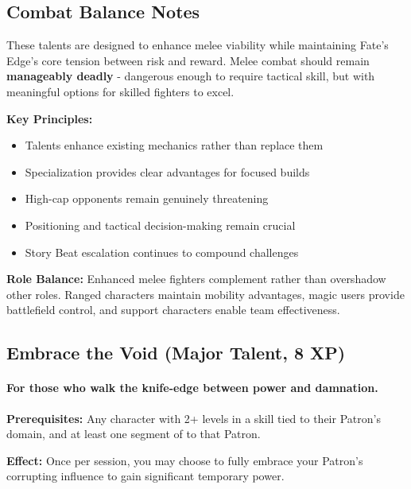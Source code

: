 \subsection{Combat Balance Notes}

These talents are designed to enhance melee viability while maintaining Fate's Edge's core tension between risk and reward. Melee combat should remain \textbf{manageably deadly} - dangerous enough to require tactical skill, but with meaningful options for skilled fighters to excel.

\textbf{Key Principles:}
\begin{itemize}
    \item Talents enhance existing mechanics rather than replace them
    \item Specialization provides clear advantages for focused builds
    \item High-cap opponents remain genuinely threatening
    \item Positioning and tactical decision-making remain crucial
    \item Story Beat escalation continues to compound challenges
\end{itemize}

\textbf{Role Balance:} Enhanced melee fighters complement rather than overshadow other roles. Ranged characters maintain mobility advantages, magic users provide battlefield control, and support characters enable team effectiveness.

\subsection{Embrace the Void (Major Talent, 8 XP)}
\paragraph{For those who walk the knife-edge between power and damnation.}

\textbf{Prerequisites:} Any character with 2+ levels in a skill tied to their Patron's domain, and at least one segment of  to that Patron.

\textbf{Effect:} Once per session, you may choose to fully embrace your Patron’s corrupting influence to gain significant temporary power.

